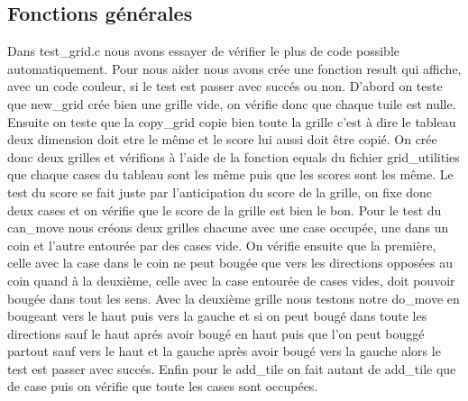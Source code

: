 \documentclass{article}
\begin{document}
  \subsection{Fonctions générales}
  Dans test\_grid.c nous avons essayer de vérifier le plus de code possible automatiquement.
  Pour nous aider nous avons crée une fonction result qui affiche, avec un code couleur, si le test est passer avec succés ou non.
  D'abord on teste que new\_grid crée bien une grille vide, on vérifie donc que chaque tuile est nulle.
  Ensuite on teste que la copy\_grid copie bien toute la grille c'est à dire le tableau deux dimension doit etre le même et le score lui aussi doit être copié. On crée donc deux grilles et vérifions à l'aide de la fonction equals du fichier grid\_utilities que chaque cases du tableau sont les même puis que les scores sont les même.
  Le test du score se fait juste par l'anticipation du score de la grille, on fixe donc deux cases et on vérifie que le score de la grille est bien le bon.
  Pour le test du can\_move nous créons deux grilles chacune avec une case occupée, une dans un coin et l'autre entourée par des cases vide. On vérifie ensuite que la première, celle avec la case dans le coin ne peut bougée que vers les directions opposées au coin quand à la deuxième, celle avec la case entourée de cases vides, doit pouvoir bougée dans tout les sens.
  Avec la deuxième grille nous testons notre do\_move en bougeant vers le haut puis vers la gauche et si on peut bougé dans toute les directions sauf le haut aprés avoir bougé en haut puis que l'on peut bouggé partout sauf vers le haut et la gauche après avoir bougé vers la gauche alors le test est passer avec succés.
  Enfin pour le add\_tile on fait autant de add\_tile que de case puis on vérifie que toute les cases sont occupées.
\end{document}
